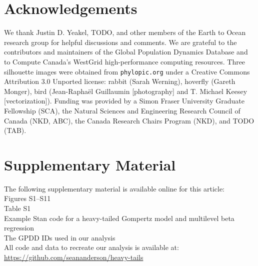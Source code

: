
\section{Acknowledgements}

We thank Justin D. Yeakel, TODO, and other members of the Earth to Ocean
research group for helpful discussions and comments. We are grateful to the
contributors and maintainers of the Global Population Dynamics Database and to
Compute Canada's WestGrid high-performance computing resources. Three
silhouette images were obtained from \texttt{phylopic.org} under a Creative
Commons Attribution 3.0 Unported license: rabbit (Sarah Werning), hoverfly
(Gareth Monger), bird (Jean-Raphaël Guillaumin {[}photography{]} and T.
Michael Keesey {[}vectorization{]}). Funding was provided by a Simon Fraser
University Graduate Fellowship (SCA), the Natural Sciences and Engineering
Research Council of Canada (NKD, ABC), the Canada Research Chairs Program
(NKD), and TODO (TAB).

\section{Supplementary Material}

The following supplementary material is available online for this article:\\
Figures S1--S11\\
Table S1\\
Example Stan code for a heavy-tailed Gompertz model and multilevel beta
regression\\
The GPDD IDs used in our analysis\\
All code and data to recreate our analysis is available at:\\
\url{https://github.com/seananderson/heavy-tails}


